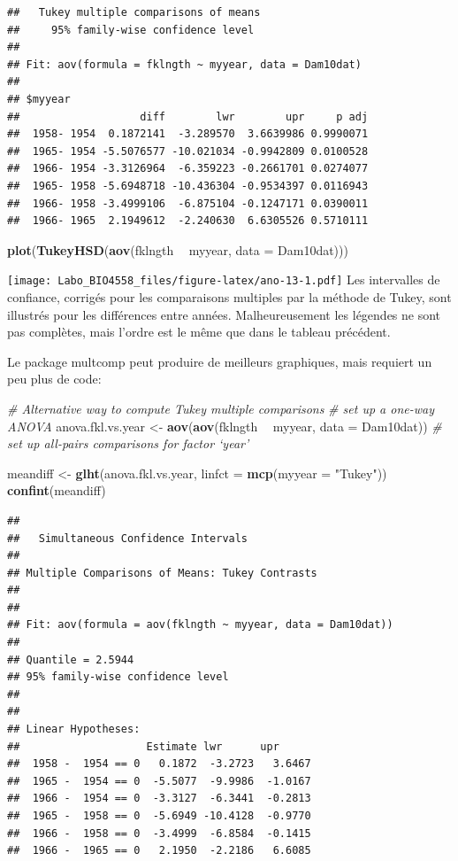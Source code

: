 \documentclass[12pt,]{book}
\newenvironment{Shaded}{\begin{snugshade}}{\end{snugshade}}
\newcommand{\CommentTok}[1]{\textcolor[rgb]{0.37,0.37,0.37}{\textit{#1}}}
\newcommand{\DataTypeTok}[1]{\textcolor[rgb]{0.27,0.27,0.27}{#1}}
\newcommand{\KeywordTok}[1]{\textcolor[rgb]{0.27,0.27,0.27}{\textbf{#1}}}
\newcommand{\NormalTok}[1]{#1}
\newcommand{\OperatorTok}[1]{\textcolor[rgb]{0.43,0.43,0.43}{\textbf{#1}}}
\newcommand{\StringTok}[1]{\textcolor[rgb]{0.5,0.5,0.5}{#1}}
\begin{document}
\begin{verbatim}
##   Tukey multiple comparisons of means
##     95% family-wise confidence level
## 
## Fit: aov(formula = fklngth ~ myyear, data = Dam10dat)
## 
## $myyear
##                   diff        lwr        upr     p adj
##  1958- 1954  0.1872141  -3.289570  3.6639986 0.9990071
##  1965- 1954 -5.5076577 -10.021034 -0.9942809 0.0100528
##  1966- 1954 -3.3126964  -6.359223 -0.2661701 0.0274077
##  1965- 1958 -5.6948718 -10.436304 -0.9534397 0.0116943
##  1966- 1958 -3.4999106  -6.875104 -0.1247171 0.0390011
##  1966- 1965  2.1949612  -2.240630  6.6305526 0.5710111
\end{verbatim}

\begin{Shaded}
\begin{Highlighting}[]
\KeywordTok{plot}\NormalTok{(}\KeywordTok{TukeyHSD}\NormalTok{(}\KeywordTok{aov}\NormalTok{(fklngth }\OperatorTok{~}\StringTok{ }\NormalTok{myyear, }\DataTypeTok{data =}\NormalTok{ Dam10dat)))}
\end{Highlighting}
\end{Shaded}

\texttt{[image: Labo\_BIO4558\_files/figure-latex/ano-13-1.pdf]}
Les intervalles de confiance, corrigés pour les comparaisons multiples par la méthode de Tukey, sont illustrés pour les différences entre années. Malheureusement les légendes ne sont pas complètes, mais l'ordre est le même que dans le tableau précédent.

Le package multcomp peut produire de meilleurs graphiques, mais requiert un peu plus de code:

\begin{Shaded}
\begin{Highlighting}[]
\CommentTok{# Alternative way to compute Tukey multiple comparisons}
\CommentTok{# set up a one-way ANOVA}
\NormalTok{anova.fkl.vs.year <-}\StringTok{ }\KeywordTok{aov}\NormalTok{(}\KeywordTok{aov}\NormalTok{(fklngth }\OperatorTok{~}\StringTok{ }\NormalTok{myyear, }\DataTypeTok{data =}\NormalTok{ Dam10dat))}
\CommentTok{# set up all-pairs comparisons for factor `year'}

\NormalTok{meandiff <-}\StringTok{ }\KeywordTok{glht}\NormalTok{(anova.fkl.vs.year, }\DataTypeTok{linfct =} \KeywordTok{mcp}\NormalTok{(}\DataTypeTok{myyear =}
\StringTok{"Tukey"}\NormalTok{))}
\KeywordTok{confint}\NormalTok{(meandiff)}
\end{Highlighting}
\end{Shaded}

\begin{verbatim}
## 
## 	 Simultaneous Confidence Intervals
## 
## Multiple Comparisons of Means: Tukey Contrasts
## 
## 
## Fit: aov(formula = aov(fklngth ~ myyear, data = Dam10dat))
## 
## Quantile = 2.5944
## 95% family-wise confidence level
##  
## 
## Linear Hypotheses:
##                    Estimate lwr      upr     
##  1958 -  1954 == 0   0.1872  -3.2723   3.6467
##  1965 -  1954 == 0  -5.5077  -9.9986  -1.0167
##  1966 -  1954 == 0  -3.3127  -6.3441  -0.2813
##  1965 -  1958 == 0  -5.6949 -10.4128  -0.9770
##  1966 -  1958 == 0  -3.4999  -6.8584  -0.1415
##  1966 -  1965 == 0   2.1950  -2.2186   6.6085
\end{verbatim}
\end{document}
